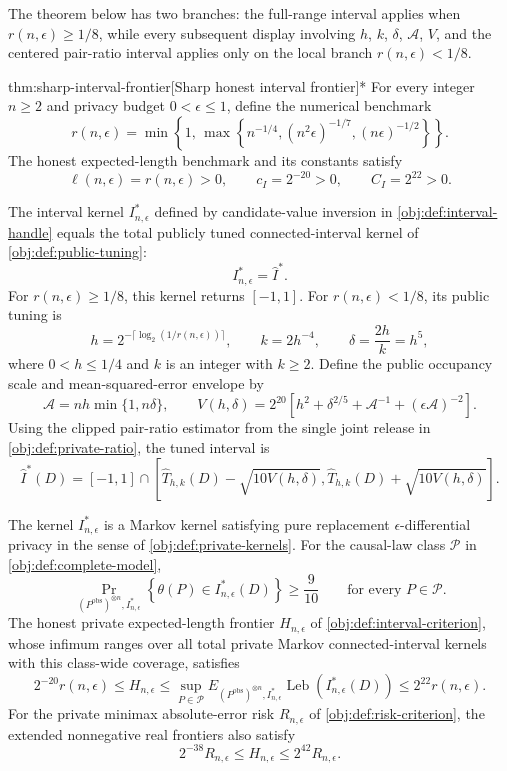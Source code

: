 The theorem below has two branches: the full-range interval applies when \(r(n,\epsilon)\ge1/8\), while every subsequent display involving \(h\), \(k\), \(\delta\), \(\mathcal A\), \(V\), and the centered pair-ratio interval applies only on the local branch \(r(n,\epsilon)<1/8\).

\begin{theoremv}{thm:sharp-interval-frontier}[Sharp honest interval frontier]*
For every integer \(n\ge2\) and privacy budget \(0<\epsilon\le1\), define the numerical benchmark
\[
r(n,\epsilon)
=
\min\left\{1,\,
\max\left\{
n^{-1/4},
(n^2\epsilon)^{-1/7},
(n\epsilon)^{-1/2}
\right\}\right\}.
\]
The honest expected-length benchmark and its constants satisfy
\[
\ell(n,\epsilon)=r(n,\epsilon)>0,
\qquad
c_I=2^{-20}>0,
\qquad
C_I=2^{22}>0.
\]

The interval kernel \(I^*_{n,\epsilon}\) defined by candidate-value inversion in \cref{obj:def:interval-handle} equals the total publicly tuned connected-interval kernel of \cref{obj:def:public-tuning}:
\[
I^*_{n,\epsilon}=\widehat I^*.
\]
For \(r(n,\epsilon)\ge1/8\), this kernel returns \([-1,1]\). For \(r(n,\epsilon)<1/8\), its public tuning is
\[
h=2^{-\lceil\log_2(1/r(n,\epsilon))\rceil},
\qquad
k=2h^{-4},
\qquad
\delta=\frac{2h}{k}=h^5,
\]
where \(0<h\le1/4\) and \(k\) is an integer with \(k\ge2\). Define the public occupancy scale and mean-squared-error envelope by
\[
\mathcal A=nh\min\{1,n\delta\},
\qquad
V(h,\delta)
=
2^{20}\left[
h^2+\delta^{2/5}+\mathcal A^{-1}
+(\epsilon\mathcal A)^{-2}
\right].
\]
Using the clipped pair-ratio estimator from the single joint release in \cref{obj:def:private-ratio}, the tuned interval is
\[
\widehat I^*(D)
=
[-1,1]\cap
\left[
\widehat T_{h,k}(D)-\sqrt{10V(h,\delta)},
\widehat T_{h,k}(D)+\sqrt{10V(h,\delta)}
\right].
\]

The kernel \(I^*_{n,\epsilon}\) is a Markov kernel satisfying pure replacement \(\epsilon\)-differential privacy in the sense of \cref{obj:def:private-kernels}. For the causal-law class \(\mathcal P\) in \cref{obj:def:complete-model},
\[
\Pr_{(P^{\mathrm{obs}})^{\otimes n},I^*_{n,\epsilon}}
\left\{\theta(P)\in I^*_{n,\epsilon}(D)\right\}
\ge\frac9{10}
\qquad\text{for every }P\in\mathcal P.
\]
The honest private expected-length frontier \(H_{n,\epsilon}\) of \cref{obj:def:interval-criterion}, whose infimum ranges over all total private Markov connected-interval kernels with this class-wide coverage, satisfies
\[
2^{-20}r(n,\epsilon)
\le H_{n,\epsilon}
\le
\sup_{P\in\mathcal P}
E_{(P^{\mathrm{obs}})^{\otimes n},I^*_{n,\epsilon}}
\operatorname{Leb}\!\left(I^*_{n,\epsilon}(D)\right)
\le2^{22}r(n,\epsilon).
\]
For the private minimax absolute-error risk \(R_{n,\epsilon}\) of \cref{obj:def:risk-criterion}, the extended nonnegative real frontiers also satisfy
\[
2^{-38}R_{n,\epsilon}
\le H_{n,\epsilon}
\le2^{42}R_{n,\epsilon}.
\]
\end{theoremv}
